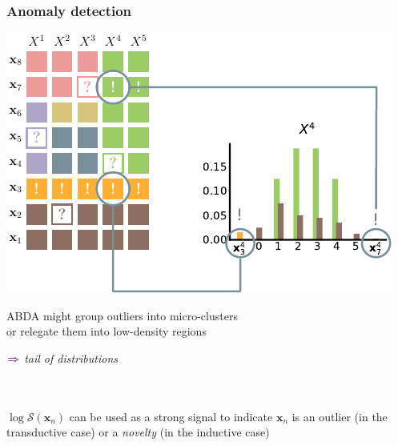\documentclass[xcolor={usenames,dvipsnames,svgnames}, compress, aspectratio=169, 11pt]{beamer}
\newcommand{\SPN}{\mathcal{S}}
\newcommand{\x}{\mathbf{x}}
\newcommand{\comment}[3][\small]{\begin{minipage}{1\linewidth}
          \raggedleft
          {
            $\color{violet}\boldsymbol\Rightarrow$
            #1
            {\emph{#2}}
          }
      \end{minipage}#3\\
}
\begin{document}
\begin{frame}[t, htt=bgrey2]
  \frametitle{Anomaly detection}

  \large
  \begin{minipage}[t]{0.66\linewidth}
    \includegraphics[width=.99\linewidth]{figures/abda-anomaly}
  \end{minipage}\hfill\begin{minipage}[t]{0.3\linewidth}
    \vspace{-150pt}

    ABDA might group outliers into micro-clusters\\

    or relegate them into low-density regions\\
    \comment{tail of distributions}\\
    
     $\log \SPN(\x_{n})$ can be used as a strong signal to indicate
     $\x_{n}$ is an outlier (in the transductive case) or a
     \textit{novelty} (in the inductive case)
     
    
  \end{minipage}  
\end{frame}
\end{document}
